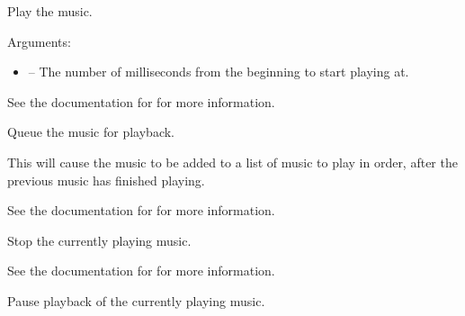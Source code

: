 \documentclass[letterpaper,10pt,english]{sphinxmanual}
\begin{document}
\begin{fulllineitems}
\label{snd:sge.snd.Music.play}
Play the music.

Arguments:
\begin{itemize}
\item {} 
 -- The number of milliseconds from the beginning to
start playing at.

\end{itemize}

See the documentation for {\hyperref[snd:sge.snd.Sound.play]{\emph{}}} for more
information.

\end{fulllineitems}


\begin{fulllineitems}
\label{snd:sge.snd.Music.queue}
Queue the music for playback.

This will cause the music to be added to a list of music to play
in order, after the previous music has finished playing.

See the documentation for {\hyperref[snd:sge.snd.Music.play]{\emph{}}} for more
information.

\end{fulllineitems}


\begin{fulllineitems}
\label{snd:sge.snd.Music.stop}
Stop the currently playing music.

See the documentation for {\hyperref[snd:sge.snd.Sound.stop]{\emph{}}} for more
information.

\end{fulllineitems}


\begin{fulllineitems}
\label{snd:sge.snd.Music.pause}
Pause playback of the currently playing music.

\end{fulllineitems}
\end{document}
